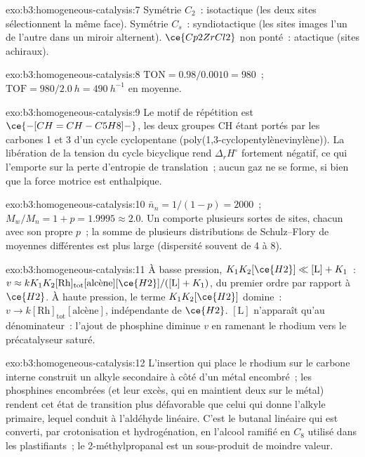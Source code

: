 \begin{solution}{exo:b3:homogeneous-catalysis:7}
Symétrie $C_2$~: isotactique (les deux sites sélectionnent la même face). Symétrie $C_s$~:
syndiotactique (les sites images l'un de l'autre dans un miroir alternent). $\ce{Cp2ZrCl2}$ non ponté~: atactique (sites
achiraux).
\end{solution}

\begin{solution}{exo:b3:homogeneous-catalysis:8}
$\mathrm{TON} = 0.98/0.0010 = 980$~; $\mathrm{TOF} = 980/\qty{2.0}{h} = \qty{490}{h^{-1}}$ en moyenne.
\end{solution}

\begin{solution}{exo:b3:homogeneous-catalysis:9}
Le motif de répétition est $\ce{-[CH=CH-C5H8]-}$, les deux groupes CH étant portés par les carbones 1 et 3 d'un
cycle cyclopentane (poly(1,3-cyclopentylènevinylène)). La libération de la
tension du cycle bicyclique rend $\Delta_rH^\circ$ fortement négatif, ce qui l'emporte sur la
perte d'entropie de translation~; aucun gaz ne se forme, si bien que la
force motrice est enthalpique.
\end{solution}

\begin{solution}{exo:b3:homogeneous-catalysis:10}
$\bar n_n = 1/(1 - p) = 2000$~; $M_w/M_n = 1 + p = 1.9995 \approx 2.0$. Un  comporte
plusieurs sortes de sites, chacun avec son propre $p$~; la somme de plusieurs distributions de Schulz--Flory
de moyennes différentes est plus large (dispersité souvent de 4 à 8).
\end{solution}

\begin{solution}{exo:b3:homogeneous-catalysis:11}
À basse pression, $K_1K_2[\ce{H2}] \ll [\mathrm L] + K_1$~: $v \approx kK_1K_2[\mathrm{Rh}]_{\mathrm{tot}}[\text{alcène}][\ce{H2}]/([\mathrm L] + K_1)$,
du premier ordre par rapport à $\ce{H2}$. À haute pression, le terme $K_1K_2[\ce{H2}]$ domine~: $v \to k[\mathrm{Rh}]_{\mathrm{tot}}[\text{alcène}]$,
indépendante de $\ce{H2}$. $[\mathrm L]$ n'apparaît qu'au dénominateur~: l'ajout de phosphine diminue $v$
en ramenant le rhodium vers le précatalyseur saturé.
\end{solution}

\begin{solution}{exo:b3:homogeneous-catalysis:12}
L'insertion qui place le rhodium sur le carbone interne construit un alkyle
secondaire à côté d'un métal encombré~; les phosphines encombrées (et leur
excès, qui en maintient deux sur le métal) rendent cet état de transition
plus défavorable que celui qui donne l'alkyle primaire, lequel conduit à
l'aldéhyde linéaire. C'est le butanal linéaire qui est converti, par
crotonisation et hydrogénation, en l'alcool ramifié en $C_8$ utilisé dans les
plastifiants~; le 2-méthylpropanal est un sous-produit de moindre valeur.
\end{solution}

